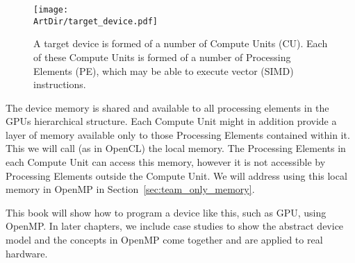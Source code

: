 \begin{figure}[t]
\centerline{\texttt{[image: \\ArtDir/target\_device.pdf]}}
\caption{A target device is formed of a number of Compute Units (CU). Each of these Compute Units is formed of a number of Processing Elements (PE), which may be able to execute vector (SIMD) instructions.}
\label{figure:target_device_hierarchy}
\end{figure}

The device memory is shared and available to all processing elements in the GPUs hierarchical structure.
Each Compute Unit might in addition provide a layer of memory available only to those Processing Elements contained within it.
This we will call (as in OpenCL) the local memory.
The Processing Elements in each Compute Unit can access this memory, however it is not accessible by Processing Elements outside the Compute Unit.
We will address using this local memory in OpenMP in Section~\ref{sec:team_only_memory}.

This book will show how to program a device like this, such as GPU, using OpenMP.
In later chapters, we include case studies to show the abstract device model and the concepts in OpenMP come together and are applied to real hardware.





